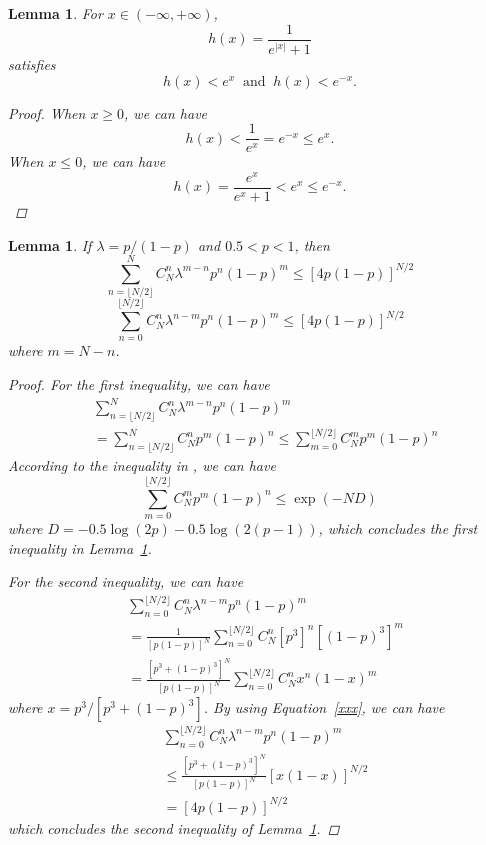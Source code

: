 \documentclass{article}
\newtheorem{lemma}[theorem]{Lemma}
\begin{document}
\begin{lemma}
\label{Concave2}
For $x\in(-\infty, +\infty)$, 
$$h(x)=\frac{1}{e^{|x|}+1}$$
satisfies
$$h(x)< e^x \;\;\mathrm{and}\;\; h(x)< e^{-x}.$$
\begin{proof}
When $x\geq 0$, we can have
\begin{equation}
h(x)<\frac{1}{e^x}=e^{-x}\leq e^{x}.
\end{equation}
When $x\leq 0$, we can have
\begin{equation}
h(x)=\frac{e^x}{e^x+1}<e^{x}\leq e^{-x}.
\end{equation}
\end{proof}
\end{lemma}

\begin{lemma}
\label{Concave3}
If $\lambda=p/(1-p)$ and $0.5<p<1$, then
$${\sum}_{n=\lfloor N/2 \rfloor}^{N}C_N^n\lambda^{m-n}p^n(1-p)^m\leq [4p(1-p)]^{N/2}$$
$${\sum}_{n=0}^{\lfloor N/2 \rfloor}C_N^n\lambda^{n-m}p^n(1-p)^m\leq [4p(1-p)]^{N/2}$$
where $m=N-n$.
\begin{proof}
For the first inequality, we can have
\begin{align}
&\sum_{n=\lfloor N/2 \rfloor}^{N}C_N^n\lambda^{m-n}p^n(1-p)^m \\&=\sum_{n=\lfloor N/2 \rfloor}^{N}C_N^np^m(1-p)^n\leq \sum_{m=0}^{\lfloor N/2 \rfloor}C_N^m p^m(1-p)^n\nonumber
\end{align}
According to the inequality in \cite{Arratia1989}, we can have
\begin{equation}
\label{xxx}
 \sum_{m=0}^{\lfloor N/2 \rfloor}C_N^m p^m(1-p)^n \leq \exp (-ND)
\end{equation}
where $D=-0.5\log(2p)-0.5\log(2(p-1))$, which concludes the first inequality in Lemma~\ref{Concave3}.

For the second inequality, we can have
\begin{equation}
\begin{split}
&\sum_{n=0}^{\lfloor N/2 \rfloor}C_N^n\lambda^{n-m}p^n(1-p)^m \\
&= \frac{1}{[p(1-p)]^N}\sum_{n=0}^{\lfloor N/2 \rfloor}C_N^n[p^3]^n[(1-p)^3]^m
 \\&=\frac{[p^3+(1-p)^3]^N}{[p(1-p)]^N}\sum_{n=0}^{\lfloor N/2 \rfloor}C_N^n x^n(1-x)^m
\end{split}
\end{equation}
where $x=p^3/[p^3+(1-p)^3]$. By using Equation~\ref{xxx}, we can have
\begin{equation}
\begin{split}
&\sum_{n=0}^{\lfloor N/2 \rfloor}C_N^n\lambda^{n-m}p^n(1-p)^m\\
&\leq \frac{[p^3+(1-p)^3]^N}{[p(1-p)]^N} [x(1-x)]^{N/2} \\
&=[4p(1-p)]^{N/2}
\end{split}
\end{equation}
which concludes the second inequality of Lemma~\ref{Concave3}.
\end{proof}
\end{lemma}


\end{document}
